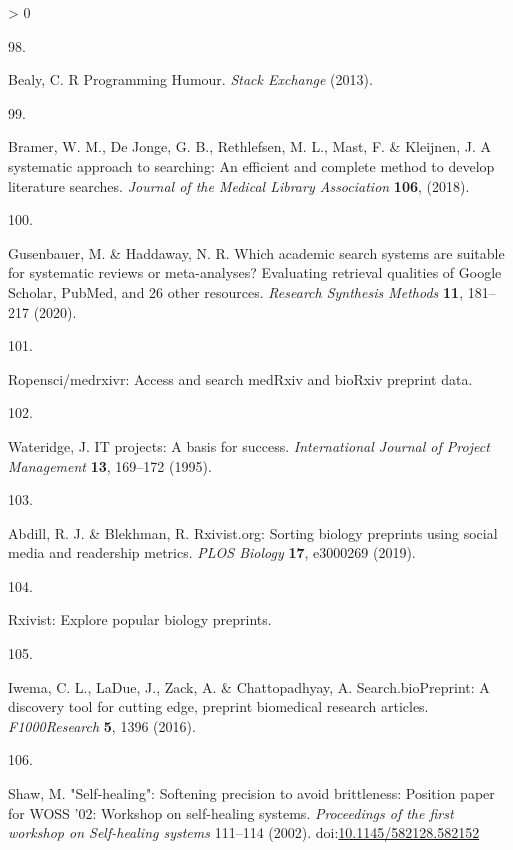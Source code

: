 \documentclass[a4paper, twoside]{templates/ociamthesis}
\newlength{\cslhangindent}
\newlength{\csllabelwidth}
\newenvironment{CSLReferences}[3] %
 {%
  \setlength{\parindent}{0pt}
  \ifodd #1 \everypar{\setlength{\hangindent}{\cslhangindent}}\ignorespaces\fi
  \ifnum #2 > 0
  \setlength{\parskip}{#2\baselineskip}
  \fi
 }%
 {}
\newcommand{\CSLLeftMargin}[1]{\parbox[t]{\maxof{\widthof{#1}}{\csllabelwidth}}{#1}}
\newcommand{\CSLRightInline}[1]{\parbox[t]{\linewidth - \csllabelwidth}{#1}}
\begin{document}
\begin{CSLReferences}{0}{0}
\leavevmode\hypertarget{ref-bealy2013}{}%
\CSLLeftMargin{98. }
\CSLRightInline{Bealy, C. R {Programming Humour}. \emph{Stack Exchange} (2013).}

\leavevmode\hypertarget{ref-bramer2018a}{}%
\CSLLeftMargin{99. }
\CSLRightInline{Bramer, W. M., De Jonge, G. B., Rethlefsen, M. L., Mast, F. \& Kleijnen, J. A systematic approach to searching: An efficient and complete method to develop literature searches. \emph{Journal of the Medical Library Association} \textbf{106}, (2018).}

\leavevmode\hypertarget{ref-gusenbauer2020}{}%
\CSLLeftMargin{100. }
\CSLRightInline{Gusenbauer, M. \& Haddaway, N. R. Which academic search systems are suitable for systematic reviews or meta-analyses? {Evaluating} retrieval qualities of {Google Scholar}, {PubMed}, and 26 other resources. \emph{Research Synthesis Methods} \textbf{11}, 181--217 (2020).}

\leavevmode\hypertarget{ref-zotero-15029}{}%
\CSLLeftMargin{101. }
\CSLRightInline{Ropensci/medrxivr: {Access} and search {medRxiv} and {bioRxiv} preprint data.}

\leavevmode\hypertarget{ref-wateridge1995}{}%
\CSLLeftMargin{102. }
\CSLRightInline{Wateridge, J. {IT} projects: A basis for success. \emph{International Journal of Project Management} \textbf{13}, 169--172 (1995).}

\leavevmode\hypertarget{ref-abdill2019}{}%
\CSLLeftMargin{103. }
\CSLRightInline{Abdill, R. J. \& Blekhman, R. Rxivist.org: {Sorting} biology preprints using social media and readership metrics. \emph{PLOS Biology} \textbf{17}, e3000269 (2019).}

\leavevmode\hypertarget{ref-zotero-15027}{}%
\CSLLeftMargin{104. }
\CSLRightInline{Rxivist: {Explore} popular biology preprints.}

\leavevmode\hypertarget{ref-iwema2016}{}%
\CSLLeftMargin{105. }
\CSLRightInline{Iwema, C. L., LaDue, J., Zack, A. \& Chattopadhyay, A. Search.{bioPreprint}: A discovery tool for cutting edge, preprint biomedical research articles. \emph{F1000Research} \textbf{5}, 1396 (2016).}

\leavevmode\hypertarget{ref-shaw2002}{}%
\CSLLeftMargin{106. }
\CSLRightInline{Shaw, M. "{Self}-healing": Softening precision to avoid brittleness: Position paper for {WOSS} '02: Workshop on self-healing systems. \emph{Proceedings of the first workshop on Self-healing systems} 111--114 (2002). doi:\href{https://doi.org/10.1145/582128.582152}{10.1145/582128.582152}}


\end{CSLReferences}
\end{document}

